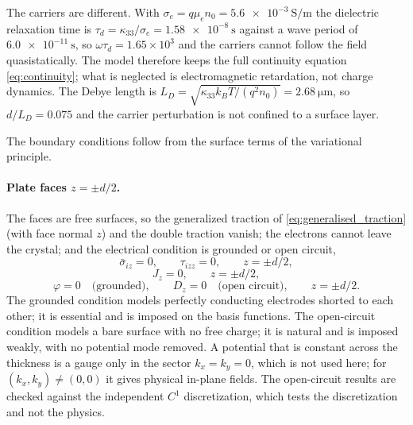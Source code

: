 The carriers are different.  With $\sigma_e=q\mu_en_0=\SI{5.6e-3}{\siemens\per\metre}$ the dielectric relaxation time is $\tau_d=\kappa_{33}/\sigma_e=\SI{1.58e-8}{\second}$ against a wave period of $\SI{6.0e-11}{\second}$, so $\omega\tau_d=1.65\times10^{3}$ and the carriers cannot follow the field quasistatically.  The model therefore keeps the full continuity equation \eqref{eq:continuity}; what is neglected is electromagnetic retardation, not charge dynamics.  The Debye length is $L_D=\sqrt{\kappa_{33}k_BT/(q^2n_0)}=\SI{2.68}{\micro\metre}$, so $d/L_D=0.075$ and the carrier perturbation is not confined to a surface layer.

The boundary conditions follow from the surface terms of the variational principle.

\paragraph{Plate faces $z=\pm d/2$.}  The faces are free surfaces, so the generalized traction of \eqref{eq:generalised_traction} (with face normal $z$) and the double traction vanish; the electrons cannot leave the crystal; and the electrical condition is grounded or open circuit,
\begin{equation}
\label{eq:bc_faces_mech}
\bar\sigma_{iz}=0,\qquad \tau_{izz}=0,\qquad z=\pm d/2,
\end{equation}
\begin{equation}
\label{eq:bc_faces_carrier}
J_z=0,\qquad z=\pm d/2,
\end{equation}
\begin{equation}
\label{eq:bc_grounded}
\varphi=0\quad\text{(grounded)},\qquad
D_z=0\quad\text{(open circuit)},\qquad z=\pm d/2 .
\end{equation}
The grounded condition models perfectly conducting electrodes shorted to each other; it is essential and is imposed on the basis functions.  The open-circuit condition models a bare surface with no free charge; it is natural and is imposed weakly, with no potential mode removed.  A potential that is constant across the thickness is a gauge only in the sector $k_x=k_y=0$, which is not used here; for $(k_x,k_y)\neq(0,0)$ it gives physical in-plane fields.  The open-circuit results are checked against the independent $C^{1}$ discretization, which tests the discretization and not the physics.

